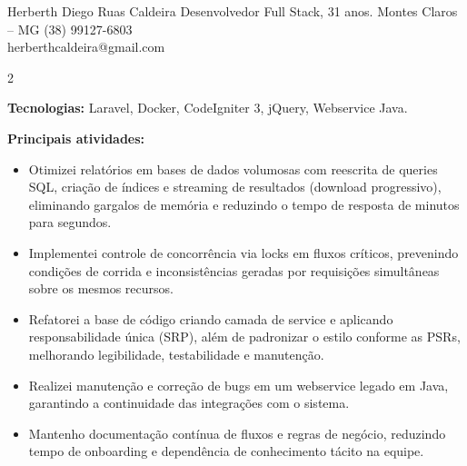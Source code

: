 \documentclass[10pt]{article}
\begin{document}
\cvheader
  {Herberth Diego Ruas Caldeira}
  {Desenvolvedor Full Stack, 31 anos.}
  {Montes Claros -- MG}
  {(38) 99127-6803 \\ herberthcaldeira@gmail.com}

\begin{paracol}{2}

\small



\textbf{Tecnologias:} Laravel, Docker, CodeIgniter 3, jQuery, Webservice Java.\par\vspace{4pt}
\textbf{Principais atividades:}\vspace{2pt}
\begin{itemize}
  \item Otimizei relatórios em bases de dados volumosas com reescrita de queries SQL, criação de índices e streaming de resultados (download progressivo), eliminando gargalos de memória e reduzindo o tempo de resposta de minutos para segundos.
  \item Implementei controle de concorrência via locks em fluxos críticos, prevenindo condições de corrida e inconsistências geradas por requisições simultâneas sobre os mesmos recursos.
  \item Refatorei a base de código criando camada de service e aplicando responsabilidade única (SRP), além de padronizar o estilo conforme as PSRs, melhorando legibilidade, testabilidade e manutenção.
  \item Realizei manutenção e correção de bugs em um webservice legado em Java, garantindo a continuidade das integrações com o sistema.
  \item Mantenho documentação contínua de fluxos e regras de negócio, reduzindo tempo de onboarding e dependência de conhecimento tácito na equipe.
\end{itemize}


\end{paracol}
\end{document}
